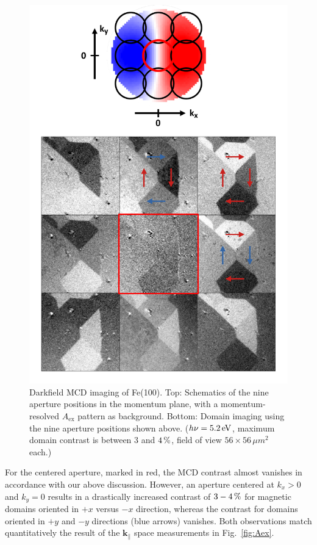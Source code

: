 \documentclass[prl,twocolumn,floatfix,superscriptaddress,aps]{revtex4-2}
\renewcommand{\vec}[1]{\boldsymbol{#1}}
\begin{document}
\begin{figure}
    \centering
    \includegraphics[width = 0.7\columnwidth]{FePaper9FelderSchema.pdf}
    \caption{Darkfield MCD imaging of Fe(100). Top: Schematics of the nine aperture positions in the momentum plane, with a momentum-resolved $A_{\mathrm{ex}}$ pattern as background. Bottom: Domain imaging using the nine aperture positions shown above. ($h \nu = \unit[5.2]{eV}$, 
    maximum domain contrast is between 3 and $\unit[4]{\%}$, field of view $56\times56\,\mu m^2$ each.)}
    \label{fig:Imaging}
\end{figure}

For the centered aperture, marked in red, the MCD contrast almost vanishes in accordance with our above discussion. However, an aperture centered at $k_x > 0$ and $k_y = 0$ results in a drastically increased contrast of $\unit[3-4]{\%}$ for magnetic domains oriented in $+x$ versus $-x$ direction, whereas the contrast for domains oriented in $+y$ and $-y$ directions (blue arrows) vanishes. Both observations match quantitatively the result of the $\vec{k}_{\parallel}$ space measurements in Fig.~\ref{fig:Aex}. 
\end{document}
